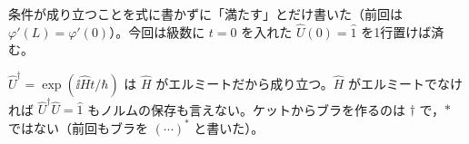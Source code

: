 \item {} 条件が成り立つことを式に書かずに「満たす」とだけ書いた（前回は $\varphi'(L)=\varphi'(0)$）。今回は級数に $t=0$ を入れた $\hat{U}(0)=\hat{1}$ を1行置けば済む。
\item {} $\hat{U}^{\dagger}=\exp(\ii\hat{H}t/\hbar)$ は $\hat{H}$ がエルミートだから成り立つ。$\hat{H}$ がエルミートでなければ $\hat{U}^{\dagger}\hat{U}=\hat{1}$ もノルムの保存も言えない。ケットからブラを作るのは $\dagger$ で，$*$ ではない（前回もブラを $(\cdots)^{*}$ と書いた）。
